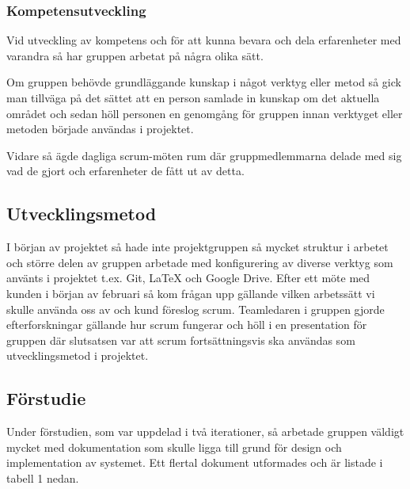 \documentclass[a4paper,10pt]{article}
\begin{document}
\subsubsection{Kompetensutveckling}
Vid utveckling av kompetens och för att kunna bevara och dela erfarenheter med varandra så har gruppen arbetat på några olika sätt.

Om gruppen behövde grundläggande kunskap i något verktyg eller metod så gick man tillväga på det sättet att en person samlade in kunskap om det aktuella området och sedan höll personen en genomgång för gruppen innan verktyget eller metoden började användas i projektet.

Vidare så ägde dagliga scrum-möten rum där gruppmedlemmarna delade med sig vad de gjort och erfarenheter de fått ut av detta.

\subsection{Utvecklingsmetod}
I början av projektet så hade inte projektgruppen så mycket struktur i arbetet och större delen av gruppen arbetade med konfigurering av diverse verktyg som använts i projektet t.ex. Git, LaTeX och Google Drive.
Efter ett möte med kunden i början av februari så kom frågan upp gällande vilken arbetssätt vi skulle använda oss av och kund föreslog scrum. Teamledaren i gruppen gjorde efterforskningar gällande hur scrum fungerar och höll i en presentation för gruppen där slutsatsen var att scrum fortsättningsvis ska användas som utvecklingsmetod i projektet.

\subsection{Förstudie}
\label{sec:forstudie}
Under förstudien, som var uppdelad i två iterationer, så arbetade gruppen väldigt mycket med dokumentation som skulle ligga till grund för design och implementation av systemet. Ett flertal dokument utformades och är listade i tabell 1 nedan.
\end{document}
